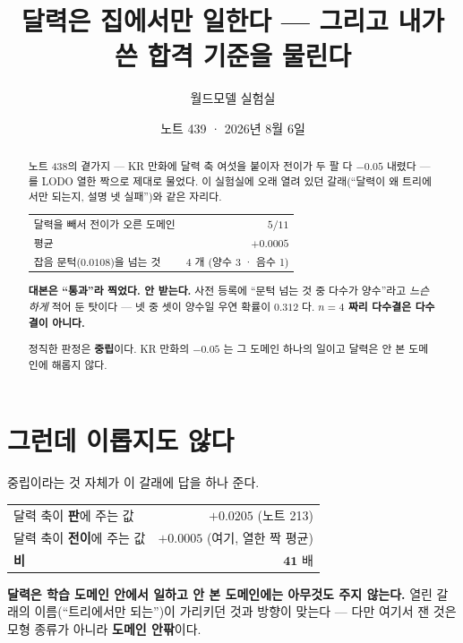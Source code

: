 \documentclass[11pt]{article}
\begin{document}
\title{달력은 집에서만 일한다 --- 그리고 내가 쓴 합격 기준을 물린다}
\author{월드모델 실험실}
\date{노트 439 · 2026년 8월 6일}
\maketitle

\begin{abstract}
노트 438의 곁가지 --- KR 만화에 달력 축 여섯을 붙이자 전이가 두 팔 다
$-0.05$ 내렸다 --- 를 LODO 열한 짝으로 제대로 물었다. 이 실험실에 오래
열려 있던 갈래(``달력이 왜 트리에서만 되는지, 설명 넷 실패'')와 같은 자리다.

\begin{center}
\begin{tabular}{lr}
\hline
달력을 빼서 전이가 오른 도메인 & $5/11$ \\
평균 & $\mathbf{+0.0005}$ \\
잡음 문턱($0.0108$)을 넘는 것 & $4$ 개 (양수 3 · 음수 1) \\
\hline
\end{tabular}
\end{center}

\textbf{대본은 ``통과''라 찍었다. 안 받는다.} 사전 등록에 ``문턱 넘는 것 중
다수가 양수''라고 \emph{느슨하게} 적어 둔 탓이다 --- 넷 중 셋이 양수일 우연
확률이 $\mathbf{0.312}$ 다. \textbf{$n{=}4$ 짜리 다수결은 다수결이 아니다.}

정직한 판정은 \textbf{중립}이다. KR 만화의 $-0.05$ 는 그 도메인 하나의 일이고
달력은 안 본 도메인에 해롭지 않다.
\end{abstract}

\section{그런데 이롭지도 않다}

중립이라는 것 자체가 이 갈래에 답을 하나 준다.

\begin{center}
\begin{tabular}{lr}
\hline
달력 축이 \textbf{판}에 주는 값 & $+0.0205$ (노트 213) \\
달력 축이 \textbf{전이}에 주는 값 & $+0.0005$ (여기, 열한 짝 평균) \\
\hline
\textbf{비} & $\mathbf{41}$ 배 \\
\hline
\end{tabular}
\end{center}

\textbf{달력은 학습 도메인 안에서 일하고 안 본 도메인에는 아무것도 주지
않는다.} 열린 갈래의 이름(``트리에서만 되는'')이 가리키던 것과 방향이 맞는다
--- 다만 여기서 잰 것은 모형 종류가 아니라 \textbf{도메인 안팎}이다.
\end{document}

